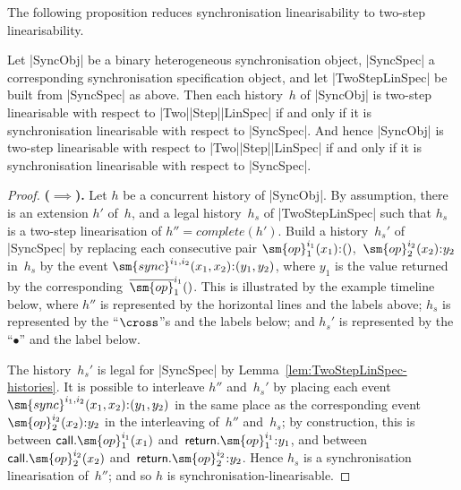 The following proposition reduces synchronisation linearisability to two-step
linearisability.
%
\begin{prop}
\label{prop:two-step-lin}
Let |SyncObj| be a binary heterogeneous synchronisation object, |SyncSpec| a
corresponding synchronisation specification object, and let |TwoStepLinSpec|
be built from |SyncSpec| as above.  Then each history~$h$ of |SyncObj| is
two-step linearisable with respect to |Two|\-|Step|\-|LinSpec| if and only if
it is synchronisation linearisable with respect to |SyncSpec|.  And hence
|SyncObj| is two-step linearisable with respect to |Two|\-|Step|\-|LinSpec| if
and only if it is synchronisation linearisable with respect to |SyncSpec|.
\end{prop}
\begin{proof}
\textbf{($\implies$).}\quad
%
Let $h$ be a concurrent history of |SyncObj|.  By assumption, there is an
extension $h'$ of~$h$, and a legal history~$h_s$ of |TwoStepLinSpec| such that
$h_s$ is a  two-step linearisation of $h'' = complete(h')$.
%
Build a history~$h_s'$ of |SyncSpec| by replacing each consecutive pair
$\sm{op}_1^{i_1}(x_1) \:: ()$,\, $\sm{op}_2^{i_2}(x_2) \:: y_2$ in~$h_s$ by
the event $\sm{sync}^{i_1,i_2}(x_1,x_2) \:: (y_1,y_2)$, where $y_1$ is the
value returned by the corresponding~$\overline{\sm{op}}_1^{i_1}()$.
%
This is illustrated by the example timeline below, where $h''$ is represented
by the horizontal lines and the labels above; $h_s$ is represented by the
``$\cross$''s and the labels below; and $h_s'$ is represented by the
``$\bullet$'' and the label below.
%
\begin{center}
\end{center}

The history~$h_s'$ is legal for |SyncSpec| by
Lemma~\ref{lem:TwoStepLinSpec-histories}.
%
It is possible to interleave $h''$ and~$h_s'$ by placing each event
$\sm{sync}^{i_1,i_2}(x_1,x_2) \:: (y_1,y_2)$ in the same place as the
corresponding event $\sm{op}_2^{i_2}(x_2) \:: y_2$ in the interleaving
of~$h''$ and~$h_s$; by construction, this is between
$\call.\sm{op}_1^{i_1}(x_1)$ and~$\return.\sm{op}_1^{i_1} \:: y_1$, and
between $\call.\sm{op}_2^{i_2}(x_2)$ and~$\return.\sm{op}_2^{i_2} \:: y_2$.
%
Hence $h_s$ is a synchronisation linearisation of~$h''$; and so $h$ is
synchronisation-linearisable.


\end{proof}
